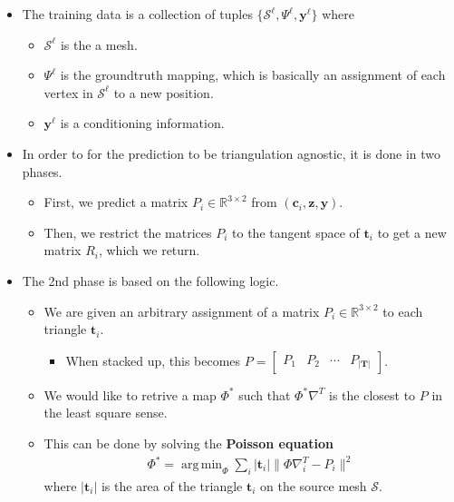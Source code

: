 \documentclass[10pt]{article}
\newcommand{\ve}[1]{\mathbf{#1}}
\newcommand{\mcal}[1]{\mathcal{#1}}
\newcommand{\Real}{\mathbb{R}}
\DeclareMathOperator*{\argmin}{arg\,min}
\begin{document}
\begin{itemize}
    \item The training data is a collection of tuples $\{ \mcal{S}^\ell, \Psi^\ell, \ve{y}^\ell \}$ where
    \begin{itemize}
        \item $\mcal{S}^\ell$ is the a mesh.
        \item $\Psi^\ell$ is the groundtruth mapping, which is basically an assignment of each vertex in $\mcal{S}^\ell$ to a new position.
        \item $\ve{y}^\ell$ is a conditioning information.
    \end{itemize}

    \item In order to for the prediction to be triangulation agnostic, it is done in two phases.
    \begin{itemize}
        \item First, we predict a matrix $P_i \in \Real^{3 \times 2}$ from $(\ve{c}_i, \ve{z}, \ve{y})$.
        \item Then, we restrict the matrices $P_i$ to the tangent space of $\ve{t}_i$ to get a new matrix $R_i$, which we return.
    \end{itemize}

    \item The 2nd phase is based on the following logic.
    \begin{itemize}
        \item We are given an arbitrary assignment of a matrix $P_i \in \Real^{3 \times 2}$ to each triangle $\ve{t}_i$.
        \begin{itemize}
            \item When stacked up, this becomes $P = \begin{bmatrix}
                P_1 & P_2 & \cdots & P_{|\ve{T}|}
            \end{bmatrix}$.
        \end{itemize}
        
        \item We would like to retrive a map $\Phi^*$ such that $\Phi^* \nabla^T$ is the closest to $P$ in the least square sense.
        
        \item This can be done by solving the {\bf Poisson equation}
        \begin{align*}
            \Phi^* = \argmin_{\Phi} \sum_{i} |\ve{t}_i| \big\| \Phi \nabla_i^T - P_i \big\|^2
        \end{align*}
        where $|\ve{t}_i|$ is the area of the triangle $\ve{t}_i$ on the source mesh $\mcal{S}$.
        

\end{itemize}
\end{itemize}
\end{document}
